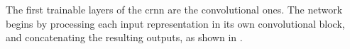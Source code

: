 
The first trainable layers of the \gls{crnn} are the
convolutional ones. The network begins by processing each
input representation in its own convolutional block, and
concatenating the resulting outputs, as shown in
.

